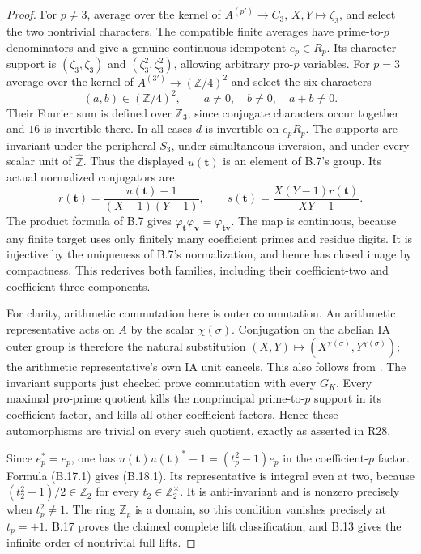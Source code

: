\begin{proof}
For $p\ne3$, average over the kernel of
$A^{(p')}\to C_3$, $X,Y\mapsto\zeta_3$, and select the two
nontrivial characters. The compatible finite averages have
prime-to-$p$ denominators and give a genuine continuous
idempotent $e_p\in R_p$. Its character support is
$(\zeta_3,\zeta_3)$ and $(\zeta_3^2,\zeta_3^2)$, allowing
arbitrary pro-$p$ variables. For $p=3$ average over the kernel
of $A^{(3')}\to(\mathbb Z/4)^2$ and select the six characters
\[
    (a,b)\in(\mathbb Z/4)^2,
             \qquad a\ne0,\quad b\ne0,\quad a+b\ne0.
\]
Their Fourier sum is defined over $\mathbb Z_3$, since conjugate
characters occur together and $16$ is invertible there.
In all cases $d$ is invertible on $e_pR_p$.
The supports are invariant under the peripheral $S_3$, under
simultaneous inversion, and under every scalar unit of
$\widehat{\mathbb Z}$. Thus the displayed $u(\mathbf t)$ is an
element of B.7's group. Its actual normalized conjugators are
\[
 r(\mathbf t)=\frac{u(\mathbf t)-1}{(X-1)(Y-1)},
 \qquad s(\mathbf t)=\frac{X(Y-1)r(\mathbf t)}{XY-1}.
\]
The product formula of B.7 gives
$\varphi_{\mathbf t}\varphi_{\mathbf v}=\varphi_{\mathbf t\mathbf v}$.
The map is continuous, because any finite target uses only
finitely many coefficient primes and residue digits. It is
injective by the uniqueness of B.7's normalization, and hence
has closed image by compactness. This rederives both families,
including their coefficient-two and coefficient-three components.

For clarity, arithmetic commutation here is outer commutation.
An arithmetic representative acts on $A$ by the scalar
$\chi(\sigma)$. Conjugation on the abelian IA outer group is
therefore the natural substitution
$(X,Y)\mapsto(X^{\chi(\sigma)},Y^{\chi(\sigma)})$; the
arithmetic representative's own IA unit cancels. This also follows
from \cite[Proposition 4.3.7]{PBC_ChenDeligne2017}.
The invariant supports just checked prove commutation with every
$G_K$. Every maximal pro-prime quotient kills the nonprincipal
prime-to-$p$ support in its coefficient factor, and kills all
other coefficient factors. Hence these automorphisms are trivial
on every such quotient, exactly as asserted in R28.

Since $e_p^*=e_p$, one has
$u(\mathbf t)u(\mathbf t)^*-1=(t_p^2-1)e_p$ in the
coefficient-$p$ factor. Formula (B.17.1) gives (B.18.1).
Its representative is integral even at two, because
$(t_2^2-1)/2\in\mathbb Z_2$ for every $t_2\in\mathbb Z_2^\times$.
It is anti-invariant and is nonzero precisely when $t_p^2\ne1$.
The ring $\mathbb Z_p$ is a domain, so this condition vanishes
precisely at $t_p=\pm1$. B.17 proves the claimed complete lift
classification, and B.13 gives the infinite order of nontrivial
full lifts.


\end{proof}
